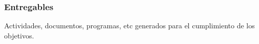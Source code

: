 \subsubsection{Entregables}
Actividades, documentos, programas, etc generados para el cumplimiento de los objetivos.